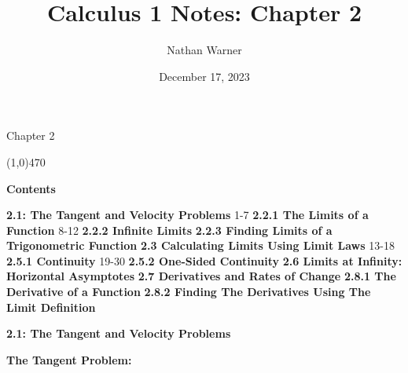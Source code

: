 \documentclass{report}
\title{\Huge{Calculus 1 Notes: Chapter 2}}
\author{\huge{Nathan Warner}}
\date{\huge{December 17, 2023}}
\begin{document}
    \maketitle

    \begin{center}
        \Huge{Chapter 2}
    \end{center}
    \line(1,0){470} 

    \bigbreak \noindent \bigbreak \noindent  
    \begin{Huge}
        \noindent \textbf{Contents}
    \end{Huge}
    
    \bigbreak \noindent \bigbreak \noindent 
    \begin{Large}
        \textbf{2.1: The Tangent and Velocity Problems } 1-7
        \bigbreak \noindent \bigbreak \noindent  
        \textbf{2.2.1 The Limits of a Function } 8-12
        \bigbreak \noindent \bigbreak \noindent  
        \textbf{2.2.2 Infinite Limits }
        \bigbreak \noindent \bigbreak \noindent 
        \textbf{2.2.3 Finding Limits of a Trigonometric Function }
        \bigbreak \noindent \bigbreak \noindent 
        \textbf{2.3 Calculating Limits Using Limit Laws} 13-18
        \bigbreak \noindent \bigbreak \noindent 
        \textbf{2.5.1 Continuity } 19-30
        \bigbreak \noindent \bigbreak \noindent 
        \textbf{2.5.2 One-Sided Continuity}
        \bigbreak \noindent \bigbreak \noindent 
        \textbf{2.6 Limits at Infinity: Horizontal Asymptotes}
        \bigbreak \noindent \bigbreak \noindent  
        \textbf{2.7 Derivatives and Rates of Change}
        \bigbreak \noindent \bigbreak \noindent 
        \textbf{2.8.1 The Derivative of a Function}
        \bigbreak \noindent \bigbreak \noindent 
        \textbf{2.8.2 Finding The Derivatives Using The Limit Definition}
    \end{Large}

    \pagebreak
    \begin{Large}
        \noindent \textbf{2.1: The Tangent and Velocity Problems}
    \end{Large}

    \bigbreak \noindent \bigbreak \noindent \bigbreak \noindent 
    \begin{large}
       \noindent \textbf{The Tangent Problem: } 
    \end{large}
   
    \bigbreak \noindent 
   
\end{document}
